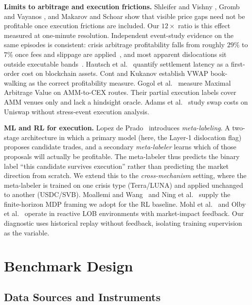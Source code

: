 \documentclass[sigconf,anonymous,natbib=false]{acmart}
\begin{document}
\textbf{Limits to arbitrage and execution frictions.}
Shleifer and Vishny \cite{shleifer1997limits}, Gromb and Vayanos
\cite{gromb2010limits}, and Makarov and Schoar
\cite{makarov2020trading} show that visible price gaps need not be
profitable once execution frictions are included.
Our $12\times$ ratio is this effect measured at one-minute resolution.
Independent event-study evidence on the same episodes is consistent: crisis
arbitrage profitability falls from roughly $29\%$ to $7\%$ once fees and slippage
are applied~\cite{iaqf_uchicago_crosscurrency_2026}, and most apparent dislocations
sit outside executable bands~\cite{iaqf_nyu_spread_2026}.
Hautsch et al.\ \cite{hautsch2018blockchain} quantify settlement latency
as a first-order cost on blockchain assets.
Cont and Kukanov \cite{cont2013optimal} establish VWAP book-walking
as the correct profitability measure.
Gogol et al.\ \cite{gogol2024amm} measure Maximal Arbitrage Value on
AMM-to-CEX routes. Their partial execution labels cover AMM venues
only and lack a hindsight oracle.
Adams et al.\ \cite{adams2023mev} study swap costs on Uniswap without
stress-event execution analysis.

\textbf{ML and RL for execution.}
Lopez de Prado~\cite{lopezdeprado2018} introduces \emph{meta-labeling}. A
two-stage architecture in which a primary model (here, the Layer-1 dislocation
flag) proposes candidate trades, and a secondary \emph{meta-labeler} learns
which of those proposals will actually be profitable.  The meta-labeler thus
predicts the binary label ``this candidate survives execution'' rather than
predicting the market direction from scratch.  We extend this to the
\emph{cross-mechanism} setting, where the meta-labeler is trained on one crisis
type (Terra/LUNA) and applied unchanged to another (USDC/SVB).
Moallemi and Wang~\cite{moallemi2022rl} and Ning et al.~\cite{ning2021ddql}
supply the finite-horizon MDP framing we adopt for the RL baseline.
Mohl et al.\ \cite{jaxmarlhft2024} and Olby et al.\
\cite{rightplace2024} operate in reactive LOB environments with
market-impact feedback. Our diagnostic uses historical replay
without feedback, isolating training supervision as the variable.


\section{Benchmark Design}
\label{sec:benchmark}

\subsection{Data Sources and Instruments}
\label{sec:data}
\end{document}
